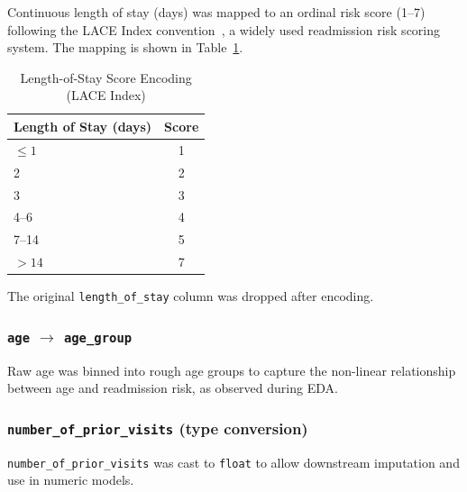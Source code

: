 \documentclass{article}
\begin{document}
\par Continuous length of stay (days) was mapped to an ordinal risk score (1--7) following
the LACE Index convention~\cite{van2010derivation}, a widely used readmission risk scoring system.
The mapping is shown in Table~\ref{tab:los_score}.

\begin{table}[H]
  \centering
  \caption{Length-of-Stay Score Encoding (LACE Index)}
  \label{tab:los_score}
  \begin{tabular}{lc}
    \toprule
    Length of Stay (days) & Score \\
    \midrule
    $\leq 1$    & 1 \\
    2           & 2 \\
    3           & 3 \\
    4--6        & 4 \\
    7--14       & 5 \\
    $> 14$      & 7 \\
    \bottomrule
  \end{tabular}
\end{table}

\noindent The original \texttt{length\_of\_stay} column was dropped after encoding.

\subsubsection{\texttt{age} $\to$ \texttt{age\_group}}

\par Raw age was binned into rough age groups to capture the non-linear relationship between age and readmission risk, as observed during EDA.

\subsubsection{\texttt{number\_of\_prior\_visits} (type conversion)}

\par \texttt{number\_of\_prior\_visits} was cast to \texttt{float} to allow downstream imputation and use in numeric models.

\end{document}
